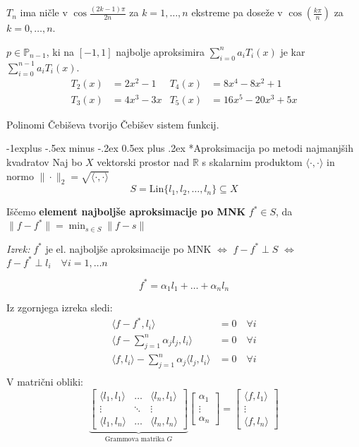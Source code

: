 \documentclass[a3paper,9pt]{extarticle}
\makeatletter
\renewcommand{\subsection}{\@startsection{subsection}{2}{0mm}%
                                {-1explus -.5ex minus -.2ex}%
                                {0.5ex plus .2ex}%
                                {\normalfont\normalsize\bfseries}}
\makeatother
\begin{document}
\begin{multicols}{5}
$T_n$ ima ničle v $\cos \frac{(2k-1)\pi}{2n}$ za $k = 1, \dots, n$ ekstreme pa doseže v $\cos(\frac{k\pi}{n})$ za $k = 0, \dots, n$.

$p \in \mathbb{P}_{n-1}$, ki na $[-1, 1]$ najbolje aproksimira $\sum_{i=0}^{n} a_i T_i(x)$ je kar $\sum_{i=0}^{n-1} a_i T_i(x)$.
{\small
\begin{align*}
	T_2(x) &= 2x^2 - 1 & T_4(x) &= 8x^4 - 8x^2 + 1\\
	T_3(x) &= 4x^3 - 3x & T_5(x) &= 16x^5 - 20x^3 + 5x
\end{align*}
}

Polinomi Čebiševa tvorijo Čebišev sistem funkcij.

\subsection*{Aproksimacija po metodi najmanjših kvadratov}
Naj bo $X$ vektorski prostor nad $\mathbb{R}$ s skalarnim produktom $\langle \cdot, \cdot \rangle$ in normo $\| \cdot \|_2 = \sqrt{\langle \cdot, \cdot \rangle}$ 
\[ S = \text{Lin}\{l_1, l_2, \dots, l_n\} \subseteq X \]

Iščemo \textbf{element najboljše aproksimacije po MNK} $f^* \in S$, da $\| f - f^* \| = \min_{s \in S} \| f - s \| $

\textit{Izrek:} $f^*$ je el. najboljše aproksimacije po MNK $\iff$ $f-f^* \perp S$ $\iff$
$f-f^* \perp l_i \quad \forall i = 1,\dots n$

\[ f^* = \alpha_1 l_1 + \dots + \alpha_n l_n\]

Iz zgornjega izreka sledi:
\begin{align*}
\langle f - f^*, l_i \rangle &= 0 \quad \forall i\\
\langle f - \sum_{j=1}^n \alpha_j l_j, l_i \rangle &= 0 \quad \forall i\\
\langle f, l_i\rangle - \sum_{j=1}^n \alpha_j \langle  l_j, l_i \rangle &= 0 \quad \forall i\\
\end{align*}
V matrični obliki:
\[
    \underbrace{\begin{bmatrix}
        \langle l_1, l_1 \rangle & \dots & \langle l_n, l_1 \rangle \\
        \vdots & \ddots & \vdots \\
        \langle l_1, l_n \rangle & \dots & \langle l_n, l_n \rangle
    \end{bmatrix}}_{\text{Grammova matrika $G$}}
    \begin{bmatrix}
        \alpha_1 \\
        \vdots \\
        \alpha_n
    \end{bmatrix}
    =
    \begin{bmatrix}
        \langle f, l_1 \rangle \\
        \vdots \\
        \langle f, l_n \rangle
    \end{bmatrix}
\]


\end{multicols}
\end{document}
